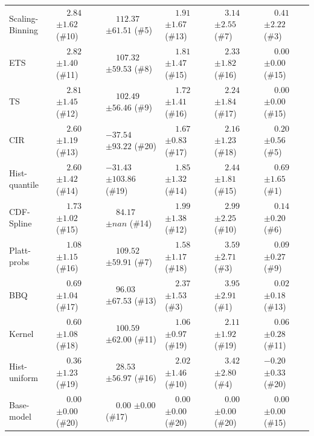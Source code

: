 \begin{tabular}{llllll}
Scaling-Binning & $\phantom{-}2.84$ {\tiny $\pm 1.62$} (\#10) & $\phantom{-}112.37$ {\tiny $\pm 61.51$} (\#5) & $\phantom{-}1.91$ {\tiny $\pm 1.67$} (\#13) & $\phantom{-}3.14$ {\tiny $\pm 2.55$} (\#7) & $\phantom{-}0.41$ {\tiny $\pm 2.22$} (\#3) \\
ETS & $\phantom{-}2.82$ {\tiny $\pm 1.40$} (\#11) & $\phantom{-}107.32$ {\tiny $\pm 59.53$} (\#8) & $\phantom{-}1.81$ {\tiny $\pm 1.47$} (\#15) & $\phantom{-}2.33$ {\tiny $\pm 1.82$} (\#16) & $\phantom{-}0.00$ {\tiny $\pm 0.00$} (\#15) \\
TS & $\phantom{-}2.81$ {\tiny $\pm 1.45$} (\#12) & $\phantom{-}102.49$ {\tiny $\pm 56.46$} (\#9) & $\phantom{-}1.72$ {\tiny $\pm 1.41$} (\#16) & $\phantom{-}2.24$ {\tiny $\pm 1.84$} (\#17) & $\phantom{-}0.00$ {\tiny $\pm 0.00$} (\#15) \\
CIR & $\phantom{-}2.60$ {\tiny $\pm 1.19$} (\#13) & $-37.54$ {\tiny $\pm 93.22$} (\#20) & $\phantom{-}1.67$ {\tiny $\pm 0.83$} (\#17) & $\phantom{-}2.16$ {\tiny $\pm 1.23$} (\#18) & $\phantom{-}0.20$ {\tiny $\pm 0.56$} (\#5) \\
Hist-quantile & $\phantom{-}2.60$ {\tiny $\pm 1.42$} (\#14) & $-31.43$ {\tiny $\pm 103.86$} (\#19) & $\phantom{-}1.85$ {\tiny $\pm 1.32$} (\#14) & $\phantom{-}2.44$ {\tiny $\pm 1.81$} (\#15) & $\phantom{-}0.69$ {\tiny $\pm 1.65$} (\#1) \\
CDF-Spline & $\phantom{-}1.73$ {\tiny $\pm 1.02$} (\#15) & $\phantom{-}84.17$ {\tiny $\pm nan$} (\#14) & $\phantom{-}1.99$ {\tiny $\pm 1.38$} (\#12) & $\phantom{-}2.99$ {\tiny $\pm 2.25$} (\#10) & $\phantom{-}0.14$ {\tiny $\pm 0.20$} (\#6) \\
Platt-probs & $\phantom{-}1.08$ {\tiny $\pm 1.15$} (\#16) & $\phantom{-}109.52$ {\tiny $\pm 59.91$} (\#7) & $\phantom{-}1.58$ {\tiny $\pm 1.17$} (\#18) & $\phantom{-}3.59$ {\tiny $\pm 2.71$} (\#3) & $\phantom{-}0.09$ {\tiny $\pm 0.27$} (\#9) \\
BBQ & $\phantom{-}0.69$ {\tiny $\pm 1.04$} (\#17) & $\phantom{-}96.03$ {\tiny $\pm 67.53$} (\#13) & $\phantom{-}2.37$ {\tiny $\pm 1.53$} (\#3) & $\phantom{-}3.95$ {\tiny $\pm 2.91$} (\#1) & $\phantom{-}0.02$ {\tiny $\pm 0.18$} (\#13) \\
Kernel & $\phantom{-}0.60$ {\tiny $\pm 1.08$} (\#18) & $\phantom{-}100.59$ {\tiny $\pm 62.00$} (\#11) & $\phantom{-}1.06$ {\tiny $\pm 0.97$} (\#19) & $\phantom{-}2.11$ {\tiny $\pm 1.92$} (\#19) & $\phantom{-}0.06$ {\tiny $\pm 0.28$} (\#11) \\
Hist-uniform & $\phantom{-}0.36$ {\tiny $\pm 1.23$} (\#19) & $\phantom{-}28.53$ {\tiny $\pm 56.97$} (\#16) & $\phantom{-}2.02$ {\tiny $\pm 1.46$} (\#10) & $\phantom{-}3.42$ {\tiny $\pm 2.80$} (\#4) & $-0.20$ {\tiny $\pm 0.33$} (\#20) \\
Base-model & $\phantom{-}0.00$ {\tiny $\pm 0.00$} (\#20) & $\phantom{-}0.00$ {\tiny $\pm 0.00$} (\#17) & $\phantom{-}0.00$ {\tiny $\pm 0.00$} (\#20) & $\phantom{-}0.00$ {\tiny $\pm 0.00$} (\#20) & $\phantom{-}0.00$ {\tiny $\pm 0.00$} (\#15) \\
\bottomrule
\end{tabular}
